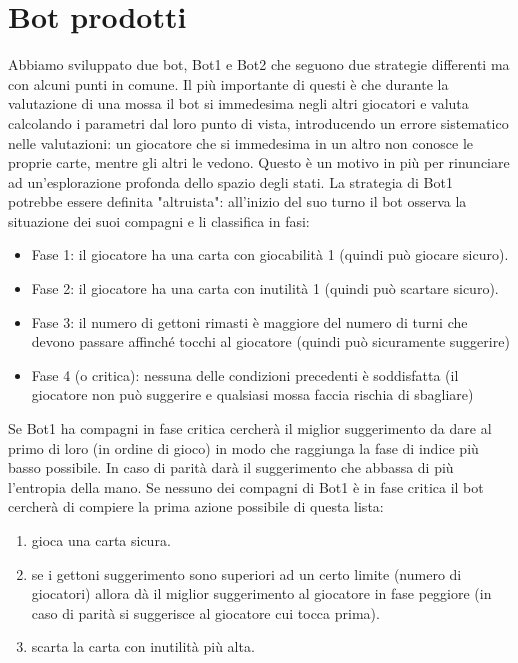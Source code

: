 \documentclass{article}
\begin{document}
\section{Bot prodotti}
Abbiamo sviluppato due bot, Bot1 e Bot2 che seguono due strategie differenti ma con alcuni punti in comune. Il più importante di questi è che durante la valutazione di una mossa il bot si immedesima negli altri giocatori e valuta calcolando i parametri dal loro punto di vista, introducendo un errore sistematico nelle valutazioni: un giocatore che si immedesima in un altro non conosce le proprie carte, mentre gli altri le vedono. Questo è un motivo in più per rinunciare ad un'esplorazione profonda dello spazio degli stati.\newline
\newline
La strategia di Bot1 potrebbe essere definita "altruista": all'inizio del suo turno il bot osserva la situazione dei suoi compagni e li classifica in fasi:
\begin{itemize}
    \item Fase 1: il giocatore ha una carta con giocabilità 1 (quindi può giocare sicuro).
    \item Fase 2: il giocatore ha una carta con inutilità 1 (quindi può scartare sicuro).
    \item Fase 3: il numero di gettoni rimasti è maggiore del numero di turni che devono passare affinché tocchi al giocatore (quindi può sicuramente suggerire)
    \item Fase 4 (o critica): nessuna delle condizioni precedenti è soddisfatta (il giocatore non può suggerire e qualsiasi mossa faccia rischia di sbagliare)
\end{itemize}
Se Bot1 ha compagni in fase critica cercherà il miglior suggerimento da dare al primo di loro (in ordine di gioco) in modo che raggiunga la fase di indice più basso possibile. In caso di parità darà il suggerimento che abbassa di più l'entropia della mano.\newline
Se nessuno dei compagni di Bot1 è in fase critica il bot cercherà di compiere la prima azione possibile di questa lista:
\begin{enumerate}
    \item gioca una carta sicura.
    \item se i gettoni suggerimento sono superiori ad un certo limite (numero di giocatori) allora dà il miglior suggerimento al giocatore in fase peggiore (in caso di parità si suggerisce al giocatore cui tocca prima).
    \item scarta la carta con inutilità più alta.
\end{enumerate}
\end{document}
